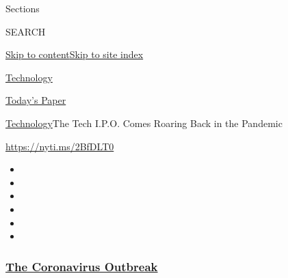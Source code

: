 Sections

SEARCH

\protect\hyperlink{site-content}{Skip to
content}\protect\hyperlink{site-index}{Skip to site index}

\href{https://www.nytimes3xbfgragh.onion/section/technology}{Technology}

\href{https://myaccount.nytimes3xbfgragh.onion/auth/login?response_type=cookie\&client_id=vi}{}

\href{https://www.nytimes3xbfgragh.onion/section/todayspaper}{Today's
Paper}

\href{/section/technology}{Technology}\textbar{}The Tech I.P.O. Comes
Roaring Back in the Pandemic

\url{https://nyti.ms/2BfDLT0}

\begin{itemize}
\item
\item
\item
\item
\item
\item
\end{itemize}

\hypertarget{the-coronavirus-outbreak}{%
\subsubsection{\texorpdfstring{\href{https://www.nytimes3xbfgragh.onion/news-event/coronavirus?name=styln-coronavirus-markets\&region=TOP_BANNER\&variant=undefined\&block=storyline_menu_recirc\&action=click\&pgtype=Article\&impression_id=222b6940-e384-11ea-ae40-4d2b82b5584d}{The
Coronavirus
Outbreak}}{The Coronavirus Outbreak}}\label{the-coronavirus-outbreak}}

